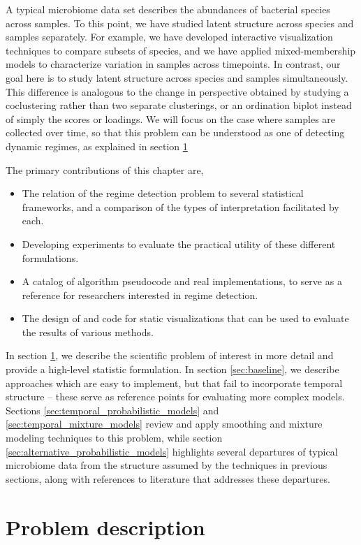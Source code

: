 \documentclass{article}
\begin{document}
A typical microbiome data set describes the abundances of bacterial species
across samples. To this point, we have studied latent structure across species
and samples separately. For example, we have developed interactive visualization
techniques to compare subsets of species, and we have applied mixed-membership
models to characterize variation in samples across timepoints. In contrast, our
goal here is to study latent structure across species and samples
simultaneously. This difference is analogous to the change in perspective
obtained by studying a coclustering rather than two separate clusterings, or an
ordination biplot instead of simply the scores or loadings. We will focus on the
case where samples are collected over time, so that this problem can be
understood as one of detecting dynamic regimes, as explained in section
\ref{sec:problem_description}

The primary contributions of this chapter are,
\begin{itemize}
\item The relation of the regime detection problem to several statistical
  frameworks, and a comparison of the types of interpretation facilitated by
  each.
\item Developing experiments to evaluate the practical utility of these
  different formulations.
\item A catalog of algorithm pseudocode and real implementations, to serve as a
  reference for researchers interested in regime detection.
\item The design of and code for static visualizations that can be used to
  evaluate the results of various methods.
\end{itemize}

In section \ref{sec:problem_description}, we describe the scientific problem of
interest in more detail and provide a high-level statistic formulation. In
section \ref{sec:baseline}, we describe approaches which are easy to implement,
but that fail to incorporate temporal structure -- these serve as reference
points for evaluating more complex models. Sections
\ref{sec:temporal_probabilistic_models} and \ref{sec:temporal_mixture_models}
review and apply smoothing and mixture modeling techniques to this problem,
while section \ref{sec:alternative_probabilistic_models} highlights several
departures of typical microbiome data from the structure assumed by the
techniques in previous sections, along with references to literature that
addresses these departures.

\section{Problem description}
\label{sec:problem_description}
\end{document}
